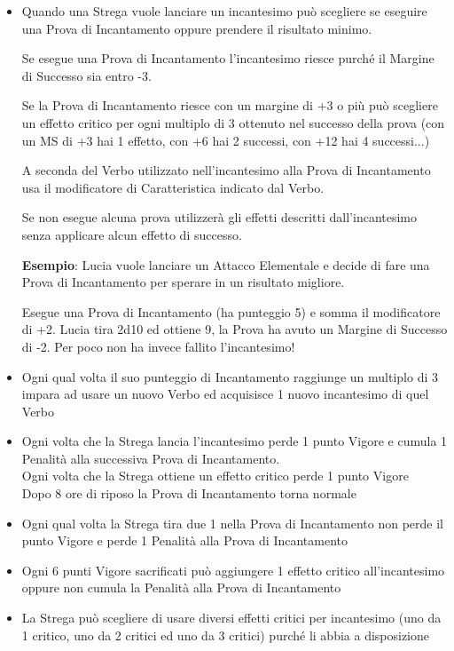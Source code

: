 \documentclass[12pt,a4paper,twoside,openany]{book}
\begin{document}
\begin{multicols}{2}
\begin{itemize}
\item 
Quando una Strega vuole lanciare un incantesimo può scegliere se eseguire una Prova di Incantamento oppure prendere il risultato minimo.

Se esegue una Prova di Incantamento l'incantesimo riesce purché il Margine di Successo sia entro -3.

Se la Prova di Incantamento riesce con un margine di +3 o più può scegliere un effetto critico per ogni multiplo di 3 ottenuto nel successo della prova (con un MS di +3 hai 1 effetto, con +6 hai 2 successi, con +12 hai 4 successi...)

A seconda del Verbo utilizzato nell'incantesimo alla Prova di Incantamento usa il modificatore di Caratteristica indicato dal Verbo.

Se non esegue alcuna prova utilizzerà gli effetti descritti dall'incantesimo senza applicare alcun effetto di successo.

\textbf{Esempio}: Lucia vuole lanciare un Attacco Elementale e decide di fare una Prova di Incantamento per sperare in un risultato migliore.

Esegue una Prova di Incantamento (ha punteggio 5) e somma il modificatore di +2.
Lucia tira 2d10 ed ottiene 9, la Prova ha avuto un Margine di Successo di -2. Per poco non ha invece fallito l'incantesimo!

\item 

Ogni qual volta il suo punteggio di Incantamento raggiunge un multiplo di 3 impara ad usare un nuovo Verbo ed acquisisce 1 nuovo incantesimo di quel Verbo

\item 
Ogni volta che la Strega lancia l'incantesimo perde 1 punto Vigore e cumula 1 Penalità alla successiva Prova di Incantamento.\\
Ogni volta che la Strega ottiene un effetto critico perde 1 punto Vigore\\
Dopo 8 ore di riposo la Prova di Incantamento torna normale

\item 
Ogni qual volta la Strega tira due 1 nella Prova di Incantamento non perde il punto Vigore e perde 1 Penalità alla Prova di Incantamento

\item 
Ogni 6 punti Vigore sacrificati può aggiungere 1 effetto critico all'incantesimo oppure non cumula la Penalità alla Prova di Incantamento

\item 
La Strega può scegliere di usare diversi effetti critici per incantesimo (uno da 1 critico, uno da 2 critici ed uno da 3 critici) purché li abbia a disposizione


\end{itemize}
\end{multicols}
\end{document}
